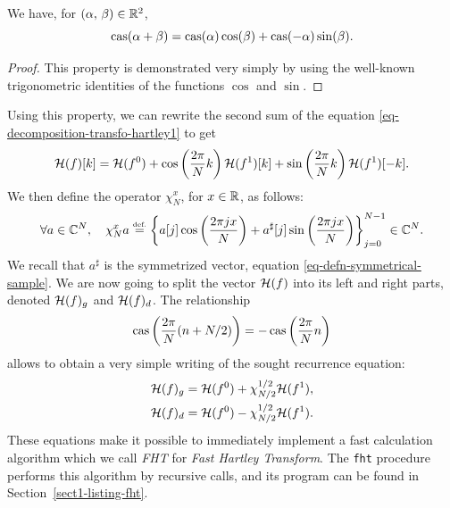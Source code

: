 \begin{prop}
We have, for $ (\alpha, \, \beta) \in \mathbb{R}^2 $,
\begin{equation}
\label{eq-prop-function-case}
\operatorname{cas} (\alpha + \beta) = \operatorname{cas} (\alpha) \cos (\beta) + \operatorname{cas} (- \alpha) \sin (\beta).
\end{equation}
\end{prop}
\begin{proof}
This property is demonstrated very simply by using the well-known trigonometric identities of the functions $ \cos $ and $ \sin $.
\end{proof}
Using this property, we can rewrite the second sum of the equation \eqref{eq-decomposition-transfo-hartley1} to get
\begin{equation*}
\mathcal{H} (f) [k] = \mathcal{H} (f^{0}) + \cos \left(\frac{2 \pi}{N} k \right) \mathcal{H} (f^{1}) [k] + \sin \left(\frac{2 \pi}{N} k \right) \mathcal{H} (f^{1}) [- k].
\end{equation*}
We then define the operator $ \chi_N^x $, for $ x \in \mathbb{R} $, as follows:
\begin{equation}
\label{eq-decomposition-transfo-hartley2}
\forall a \in \mathbb{C}^N, \quad \chi_N^xa \stackrel{\mbox{\upshape\tiny def.}}{=} \left\{a [j] \cos \left(\frac{2 \pi jx}{N} \right) + a^{\sharp}[j] \sin \left(\frac{2 \pi jx}{N} \right) \right\}_{j = 0}^{N-1} \in \mathbb{C}^N.
\end{equation}
We recall that $ a^{\sharp} $ is the symmetrized vector, equation \eqref{eq-defn-symmetrical-sample}. We are now going to split the vector $ \mathcal{H} (f) $ into its left and right parts, denoted $ \mathcal{H} (f)_g $ and $ \mathcal{H} (f)_d $. The relationship
\begin{equation*}
\operatorname{cas} \left(\frac{2 \pi}{N} (n + N / 2) \right) = - \operatorname{cas} \left(\frac{2 \pi}{N} n \right)
\end{equation*}
allows to obtain a very simple writing of the sought recurrence equation:
\begin{align}
\label{eq-decomposition-transfo-hartley}
\mathcal{H} (f)_g & = \mathcal{H} (f^0) + \chi_{N / 2}^{1/2} \mathcal{H} (f^1), \\
\label{eq-decomposition-transfo-hartley-2}
\mathcal{H} (f)_d & = \mathcal{H} (f^0) - \chi_{N / 2}^{1/2} \mathcal{H} (f^1).
\end{align}
These equations make it possible to immediately implement a fast calculation algorithm which we call \textit{FHT} for \textit{Fast Hartley Transform}. The \texttt{fht} procedure performs this algorithm by recursive calls, and its program can be found in Section~\ref{sect1-listing-fht}.
 
